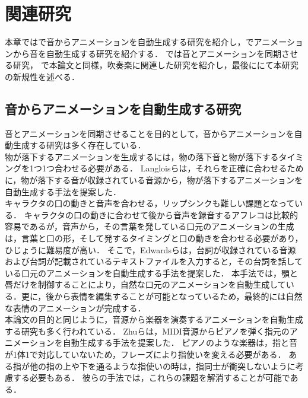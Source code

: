 \chapter{関連研究}
\label{chap:previousworks}
本章ではで音からアニメーションを自動生成する研究を紹介し，でアニメーションから音を自動生成する研究を紹介する．
では音とアニメーションを同期させる研究，
で本論文と同様，吹奏楽に関連した研究を紹介し，最後ににて本研究の新規性を述べる．

\section{音からアニメーションを自動生成する研究}\label{sec:generate_animation}
音とアニメーションを同期させることを目的として，音からアニメーションを自動生成する研究は多く存在している．\\
\indent
物が落下するアニメーションを生成するには，物の落下音と物が落下するタイミングを1つ1つ合わせる必要がある．
Langloisら\cite{IFA}は，それらを正確に合わせるために，物が落下する音が収録されている音源から，物が落下するアニメーションを自動生成する手法を提案した．\\
%
\indent
キャラクタの口の動きと音声を合わせる，リップシンクも難しい課題となっている．
キャラクタの口の動きに合わせて後から音声を録音するアフレコは比較的容易であるが，音声から，その言葉を発している口元のアニメーションの生成は，言葉と口の形，そして発するタイミングと口の動きを合わせる必要があり，ひじょうに難易度が高い．
そこで，Edwardsら\cite{JALI}は，台詞が収録されている音源および台詞が記載されているテキストファイルを入力すると，その台詞を話している口元のアニメーションを自動生成する手法を提案した．
本手法では，顎と唇だけを制御することにより，自然な口元のアニメーションを自動生成している．更に，後から表情を編集することが可能となっているため，最終的には自然な表情のアニメーションが完成する．\\
%
\indent
本論文の目的と同じように，音源から楽器を演奏するアニメーションを自動生成する研究も多く行われている．
Zhuら\cite{piano}は，MIDI音源からピアノを弾く指元のアニメーションを自動生成する手法を提案した．
ピアノのような楽器は，指と音が1体1で対応していないため，フレーズにより指使いを変える必要がある．
ある指が他の指の上や下を通るような指使いの時は，指同士が衝突しないように考慮する必要もある．
彼らの手法では，これらの課題を解消することが可能である．
%
